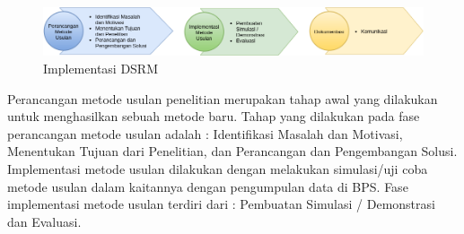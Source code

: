 \begin{figure}[h]
    \centering
    \includegraphics[width=1\textwidth]{../../Resources/Images/dsrm-implementation}
    \caption{Implementasi DSRM}
    \label{fig:dsrm-implementation}
\end{figure}


Perancangan metode usulan penelitian merupakan tahap awal yang dilakukan untuk menghasilkan sebuah metode baru. Tahap yang dilakukan pada fase perancangan metode usulan adalah : Identifikasi Masalah dan Motivasi, Menentukan Tujuan dari Penelitian, dan Perancangan dan Pengembangan Solusi. Implementasi metode usulan dilakukan dengan melakukan simulasi/uji coba metode usulan dalam kaitannya dengan pengumpulan data di BPS. Fase implementasi metode usulan terdiri dari : Pembuatan Simulasi / Demonstrasi dan Evaluasi. 

